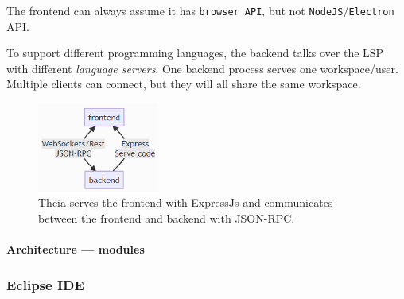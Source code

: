 The frontend can always assume it has \texttt{browser API}, but not
\texttt{NodeJS}/\texttt{Electron} \gls{API}.~\cite{typefoxArchitectureOverview}

To support different programming languages, the backend talks over the \acrfull{LSP} with different \emph{language servers}.
One backend process serves one workspace/user.
Multiple clients can connect, but they will all share the same workspace.~\cite{MultiLanguageIDEImplemented2017}

\begin{figure}[htbp]  %
  \centering
  \includegraphics[width=4cm]{figures/theia-api.png}
  \caption[Theia frontend and backend communication]{Theia serves the frontend with ExpressJs and communicates between the frontend and backend with JSON-RPC.}\label{fig:theia-communication}
\end{figure}

\paragraph*{Architecture --- modules}



\subsubsection{Eclipse IDE}
